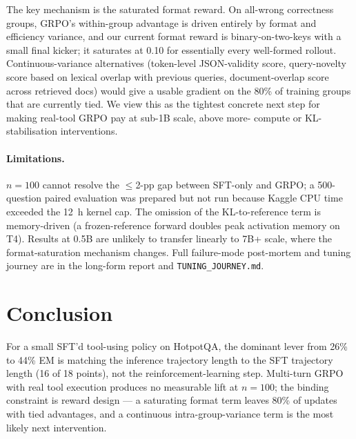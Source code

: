 \documentclass[11pt]{article}
\begin{document}
The key mechanism is the saturated format reward. On all-wrong
correctness groups, GRPO's within-group advantage is driven
entirely by format and efficiency variance, and our current
format reward is binary-on-two-keys with a small final kicker; it
saturates at 0.10 for essentially every well-formed rollout.
Continuous-variance alternatives (token-level JSON-validity
score, query-novelty score based on lexical overlap with previous
queries, document-overlap score across retrieved docs) would give
a usable gradient on the 80\% of training groups that are
currently tied. We view this as the tightest concrete next step
for making real-tool GRPO pay at sub-1B scale, above more-
compute or KL-stabilisation interventions.

\paragraph{Limitations.}
$n{=}100$ cannot resolve the $\leq$2-pp gap between SFT-only and
GRPO; a 500-question paired evaluation was prepared but not run
because Kaggle CPU time exceeded the 12~h kernel cap. The
omission of the KL-to-reference term is memory-driven (a
frozen-reference forward doubles peak activation memory on T4).
Results at 0.5B are unlikely to transfer linearly to 7B+ scale,
where the format-saturation mechanism changes. Full failure-mode
post-mortem and tuning journey are in the long-form report and
\texttt{TUNING\_JOURNEY.md}.

\section{Conclusion}
\label{sec:conclusion}

For a small SFT'd tool-using policy on HotpotQA, the dominant
lever from 26\% to 44\% EM is matching the inference trajectory
length to the SFT trajectory length (16 of 18 points), not the
reinforcement-learning step. Multi-turn GRPO with real tool
execution produces no measurable lift at $n{=}100$; the binding
constraint is reward design --- a saturating format term leaves
80\% of updates with tied advantages, and a continuous
intra-group-variance term is the most likely next intervention.




\appendix
\end{document}
